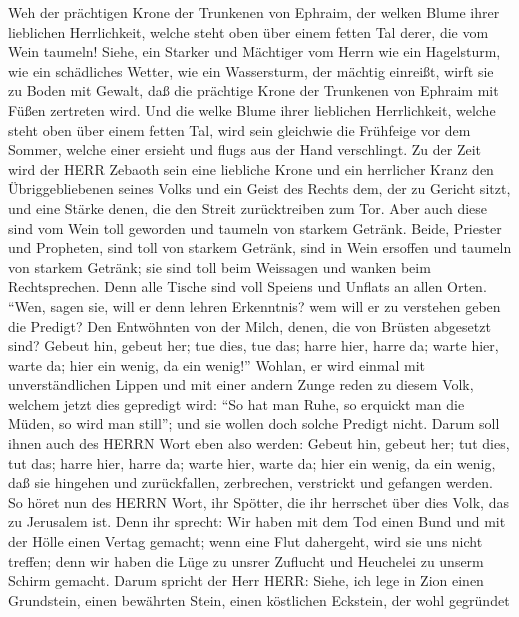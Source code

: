  Weh der prächtigen Krone der Trunkenen von Ephraim, der
welken Blume ihrer lieblichen Herrlichkeit, welche steht oben über einem
fetten Tal derer, die vom Wein taumeln!  Siehe, ein Starker
und Mächtiger vom Herrn wie ein Hagelsturm, wie ein schädliches Wetter,
wie ein Wassersturm, der mächtig einreißt, wirft sie zu Boden mit
Gewalt,  daß die prächtige Krone der Trunkenen von Ephraim
mit Füßen zertreten wird.  Und die welke Blume ihrer
lieblichen Herrlichkeit, welche steht oben über einem fetten Tal, wird
sein gleichwie die Frühfeige vor dem Sommer, welche einer ersieht und
flugs aus der Hand verschlingt.  Zu der Zeit wird der HERR
Zebaoth sein eine liebliche Krone und ein herrlicher Kranz den
Übriggebliebenen seines Volks  und ein Geist des Rechts dem,
der zu Gericht sitzt, und eine Stärke denen, die den Streit
zurücktreiben zum Tor.  Aber auch diese sind vom Wein toll
geworden und taumeln von starkem Getränk. Beide, Priester und Propheten,
sind toll von starkem Getränk, sind in Wein ersoffen und taumeln von
starkem Getränk; sie sind toll beim Weissagen und wanken beim
Rechtsprechen.  Denn alle Tische sind voll Speiens und
Unflats an allen Orten.  ``Wen, sagen sie, will er denn
lehren Erkenntnis? wem will er zu verstehen geben die Predigt? Den
Entwöhnten von der Milch, denen, die von Brüsten abgesetzt sind?
 Gebeut hin, gebeut her; tue dies, tue das; harre hier,
harre da; warte hier, warte da; hier ein wenig, da ein wenig!''
 Wohlan, er wird einmal mit unverständlichen Lippen und mit
einer andern Zunge reden zu diesem Volk, welchem jetzt dies gepredigt
wird:  ``So hat man Ruhe, so erquickt man die Müden, so
wird man still''; und sie wollen doch solche Predigt nicht.
 Darum soll ihnen auch des HERRN Wort eben also werden:
Gebeut hin, gebeut her; tut dies, tut das; harre hier, harre da; warte
hier, warte da; hier ein wenig, da ein wenig, daß sie hingehen und
zurückfallen, zerbrechen, verstrickt und gefangen werden. 
So höret nun des HERRN Wort, ihr Spötter, die ihr herrschet über dies
Volk, das zu Jerusalem ist.  Denn ihr sprecht: Wir haben
mit dem Tod einen Bund und mit der Hölle einen Vertag gemacht; wenn eine
Flut dahergeht, wird sie uns nicht treffen; denn wir haben die Lüge zu
unsrer Zuflucht und Heuchelei zu unserm Schirm gemacht. 
Darum spricht der Herr HERR: Siehe, ich lege in Zion einen Grundstein,
einen bewährten Stein, einen köstlichen Eckstein, der wohl gegründet
